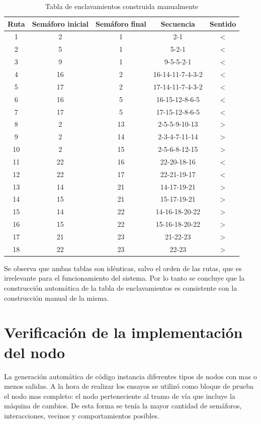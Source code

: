	 \begin{table}[!hbt]
	\caption{Tabla de enclavamientos construida manualmente}
	\label{tabla_manual}
	\centering
	\begin{tabular}{ c  c  c  c  c }
	\hline
	Ruta & Semáforo inicial & Semáforo final & Secuencia & Sentido \\	
	\hline
		1 & 2 & 1 & 2-1 & < \\
		2 & 5 & 1 & 5-2-1 & < \\
		3 & 9 & 1 & 9-5-5-2-1 & < \\
		4 & 16 & 2 & 16-14-11-7-4-3-2 & < \\
		5 & 17 & 2 & 17-14-11-7-4-3-2 & < \\
		6 & 16 & 5 & 16-15-12-8-6-5 & < \\
		7 & 17 & 5 & 17-15-12-8-6-5 & < \\
		8 & 2 & 13 & 2-5-5-9-10-13 & > \\
		9 & 2 & 14 & 2-3-4-7-11-14 & > \\
		10 & 2 & 15 & 2-5-6-8-12-15 & > \\
		11 & 22 & 16 & 22-20-18-16 & < \\
		12 & 22 & 17 & 22-21-19-17 & < \\
		13 & 14 & 21 & 14-17-19-21 & > \\
		14 & 15 & 21 & 15-17-19-21 & > \\	
		15 & 14 & 22 & 14-16-18-20-22 & > \\	
		16 & 15 & 22 & 15-16-18-20-22 & > \\		
		17 & 21 & 23 & 21-22-23 & > \\	
		18 & 22 & 23 & 22-23 & > \\
	\end{tabular}
	\end{table}
	
	 
	 
	 Se observa que ambas tablas son idénticas, salvo el orden de las rutas, que es irrelevante para el funcionamiento del sistema. Por lo tanto se concluye que la construcción automática de la tabla de enclavamientos es consistente con la construcción manual de la misma.			
			
\section{Verificación de la implementación del nodo}

	La generación automática de código instancia diferentes tipos de nodos con mas o menos salidas. A la hora de realizar los ensayos se utilizó como bloque de prueba el nodo mas completo: el nodo perteneciente al tramo de vía que incluye la máquina de cambios. De esta forma se tenía la mayor cantidad de semáforos, interacciones, vecinos y comportamientos posibles.
	
